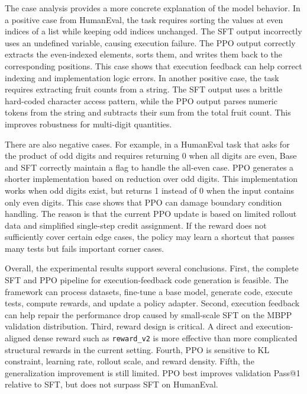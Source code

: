 \begin{digest}
The case analysis provides a more concrete explanation of the model behavior. In a positive case from HumanEval, the task requires sorting the values at even indices of a list while keeping odd indices unchanged. The SFT output incorrectly uses an undefined variable, causing execution failure. The PPO output correctly extracts the even-indexed elements, sorts them, and writes them back to the corresponding positions. This case shows that execution feedback can help correct indexing and implementation logic errors. In another positive case, the task requires extracting fruit counts from a string. The SFT output uses a brittle hard-coded character access pattern, while the PPO output parses numeric tokens from the string and subtracts their sum from the total fruit count. This improves robustness for multi-digit quantities.

There are also negative cases. For example, in a HumanEval task that asks for the product of odd digits and requires returning 0 when all digits are even, Base and SFT correctly maintain a flag to handle the all-even case. PPO generates a shorter implementation based on reduction over odd digits. This implementation works when odd digits exist, but returns 1 instead of 0 when the input contains only even digits. This case shows that PPO can damage boundary condition handling. The reason is that the current PPO update is based on limited rollout data and simplified single-step credit assignment. If the reward does not sufficiently cover certain edge cases, the policy may learn a shortcut that passes many tests but fails important corner cases.

Overall, the experimental results support several conclusions. First, the complete SFT and PPO pipeline for execution-feedback code generation is feasible. The framework can process datasets, fine-tune a base model, generate code, execute tests, compute rewards, and update a policy adapter. Second, execution feedback can help repair the performance drop caused by small-scale SFT on the MBPP validation distribution. Third, reward design is critical. A direct and execution-aligned dense reward such as \texttt{reward\_v2} is more effective than more complicated structural rewards in the current setting. Fourth, PPO is sensitive to KL constraint, learning rate, rollout scale, and reward density. Fifth, the generalization improvement is still limited. PPO best improves validation Pass@1 relative to SFT, but does not surpass SFT on HumanEval.


\end{digest}
